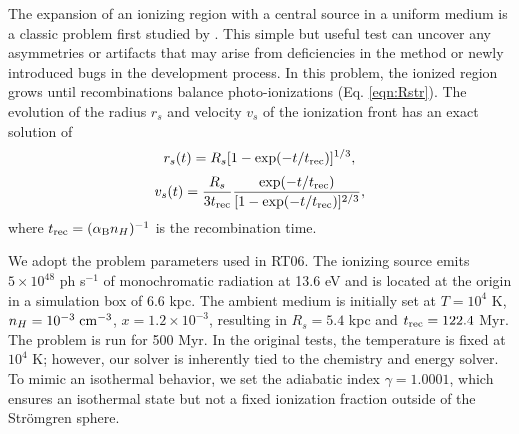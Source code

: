 \documentclass[useAMS,usenatbib,a4paper]{mn2e}
\begin{document}
The expansion of an ionizing region with a central source in a uniform
medium is a classic problem first studied by \citet{Stroemgren39}.
This simple but useful test can uncover any asymmetries or artifacts
that may arise from deficiencies in the method or newly introduced
bugs in the development process.  In this problem, the ionized region
grows until recombinations balance photo-ionizations
(Eq. \ref{eqn:Rstr}).  The evolution of the radius $r_s$ and velocity
$v_s$ of the ionization front has an exact solution of
%
\begin{equation}
  \label{eqn:rstr}
  r_s(t) = R_s [ 1 - \exp(-t/t_{\rm rec}) ]^{1/3},
\end{equation}
\begin{equation}
  \label{eqn:vstr}
  v_s(t) = \frac{R_s}{3t_{\rm rec}} \frac{\exp(-t/t_{\rm rec})} {[1 -
    \exp(-t/t_{\rm rec})]^{2/3}},
\end{equation}
where $t_{\rm rec} = (\alpha_{\rm B} n_H)^{-1}$ is the recombination
time.

We adopt the problem parameters used in RT06.  The ionizing
source emits $5 \times 10^{48}$ ph s$^{-1}$ of monochromatic radiation
at 13.6 eV and is located at the origin in a simulation box of 6.6
kpc.  The ambient medium is initially set at $T=10^4$ K, $n_H =
10^{-3}\;\cubecm$, $x = 1.2 \times 10^{-3}$, resulting in $R_s = 5.4$
kpc and $t_{\rm rec} = 122.4$ Myr.  The problem is run for 500 Myr.
In the original tests, the temperature is fixed at $10^4$ K; however,
our solver is inherently tied to the chemistry and energy solver.  To
mimic an isothermal behavior, we set the adiabatic index $\gamma =
1.0001$, which ensures an isothermal state but not a fixed ionization
fraction outside of the Str\"{o}mgren sphere.
\end{document}
